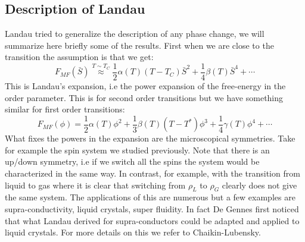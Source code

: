 \documentclass[10pt,a4paper]{book}
\begin{document}
\subsection{Description of Landau}
Landau tried to generalize the description of any phase change, we will summarize here briefly some of the results. First when we are close to the transition the assumption is that we get:
\[
F_{MF}(\bar{S}) \stackrel{T \sim T_C}{\approx} \frac{1}{2} \alpha(T) (T - T_C) \bar{S}^2 + \frac{1}{4} \beta(T) \bar{S}^4 + \cdots
\]
This is Landau's expansion, i.e the power expansion of the free-energy in the order parameter. This is for second order transitions but we have something similar for first order transitions:
\[
F_{MF}(\phi) = \frac{1}{2} \alpha(T) \phi^2 + \frac{1}{3} \beta(T) (T - T^*) \phi^3 + \frac{1}{4} \gamma(T) \phi^4 + \cdots 
\]
What fixes the powers in the expansion are the microscopical symmetries. Take for example the spin system we studied previously. Note that there is an up/down symmetry, i.e if we switch all the spins the system would be characterized in the same way. In contrast, for example, with the transition from liquid to gas where it is clear that switching from $\rho_L$ to $\rho_G$ clearly does not give the same system. The applications of this are numerous but a few examples are supra-conductivity, liquid crystals, super fluidity. In fact De Gennes first noticed that what Landau derived for supra-conductors could be adapted and applied to liquid crystals. For more details on this we refer to Chaikin-Lubensky.
\end{document}
